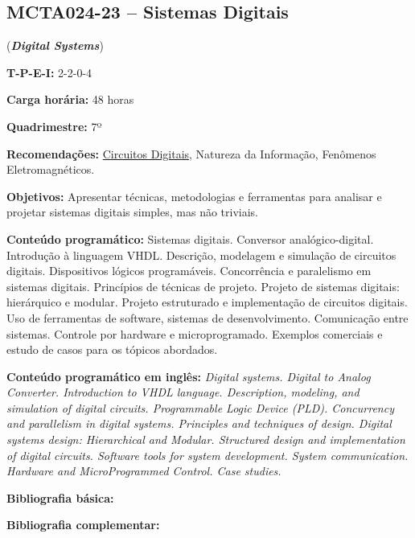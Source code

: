 \documentclass[class=article, crop=false]{standalone}
\begin{document}
\subsection{MCTA024-23 -- Sistemas Digitais}
\label{disc:sist_dig}

(\textbf{\textit{Digital Systems}})

\begin{center}
    \begin{minipage}{0.85\textwidth}
        \textbf{T-P-E-I:} 2-2-0-4
        
        \textbf{Carga horária:} 48 horas
        
        \textbf{Quadrimestre:} 7º
        
        \textbf{Recomendações:} 
        \hyperref[disc:circ_dig]{Circuitos Digitais}, 
        Natureza da Informação,
        Fenômenos Eletromagnéticos.
    \end{minipage}
\end{center}

\textbf{Objetivos:}
Apresentar técnicas, metodologias e ferramentas para analisar e projetar
sistemas digitais simples, mas não triviais.

\textbf{Conteúdo programático:}
Sistemas digitais. 
Conversor analógico-digital. 
Introdução à linguagem VHDL. 
Descrição, modelagem e simulação de circuitos digitais. 
Dispositivos lógicos programáveis. 
Concorrência e paralelismo em sistemas digitais. 
Princípios de técnicas de projeto. 
Projeto de sistemas digitais: hierárquico e modular. 
Projeto estruturado e implementação de circuitos digitais. 
Uso de ferramentas de software, sistemas de desenvolvimento. 
Comunicação entre sistemas. 
Controle por hardware e microprogramado. 
Exemplos comerciais e estudo de casos para os tópicos abordados.

\textbf{Conteúdo programático em inglês:}
\textit{Digital systems. 
Digital to Analog Converter. 
Introduction to VHDL language. 
Description, modeling, and simulation of digital circuits. 
Programmable Logic Device (PLD). 
Concurrency and parallelism in digital systems. 
Principles and techniques of design. 
Digital systems design: Hierarchical and Modular. 
Structured design and implementation of digital circuits. 
Software tools for system development. 
System communication. 
Hardware and MicroProgrammed Control. 
Case studies.}

\newrefsection
\textbf{Bibliografia básica:}
\nocite{2008-mano, 2007-tocci, 2008-vahid}
\printbibliography

\newrefsection
\textbf{Bibliografia complementar:}
\nocite{2006-idoeta, 2000-ercegovac, 2009-bignel, 2005-katz, 2008-ashenden}
\printbibliography
\end{document}
